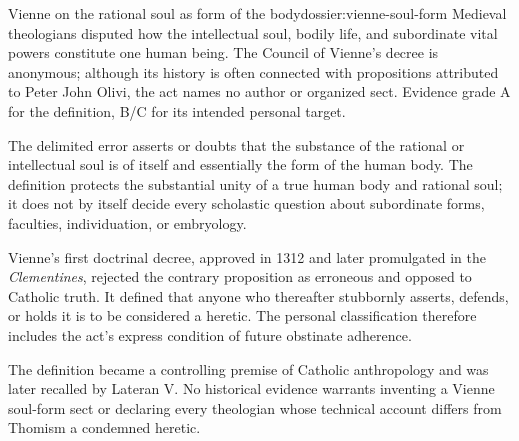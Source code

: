 \begin{heresydossier}{Vienne on the rational soul as form of the body}{dossier:vienne-soul-form}
\objectfield Medieval theologians disputed how the intellectual soul, bodily life, and subordinate vital powers constitute one human being. The Council of Vienne's decree is anonymous; although its history is often connected with propositions attributed to Peter John Olivi, the act names no author or organized sect. Evidence grade A for the definition, B/C for its intended personal target.

\propositionfield The delimited error asserts or doubts that the substance of the rational or intellectual soul is of itself and essentially the form of the human body. The definition protects the substantial unity of a true human body and rational soul; it does not by itself decide every scholastic question about subordinate forms, faculties, individuation, or embryology.

\responsefield Vienne's first doctrinal decree, approved in 1312 and later promulgated in the \emph{Clementines}, rejected the contrary proposition as erroneous and opposed to Catholic truth. It defined that anyone who thereafter stubbornly asserts, defends, or holds it is to be considered a heretic. The personal classification therefore includes the act's express condition of future obstinate adherence.

\aftermathfield The definition became a controlling premise of Catholic anthropology and was later recalled by Lateran V. No historical evidence warrants inventing a Vienne soul-form sect or declaring every theologian whose technical account differs from Thomism a condemned heretic.
\end{heresydossier}

